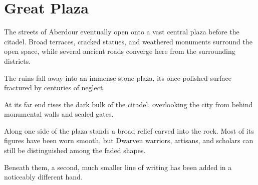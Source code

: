 \section*{ Great Plaza}
{\entryfont The streets of Aberdour eventually open onto a vast central plaza before the citadel. Broad terraces, cracked statues, and weathered monuments surround the open space, while several ancient roads converge here from the surrounding districts.}
\begin{DndReadAloud}
	The ruins fall away into an immense stone plaza, its once-polished surface fractured by centuries of neglect.

	At its far end rises the dark bulk of the citadel, overlooking the city from behind monumental walls and sealed gates.

	Along one side of the plaza stands a broad relief carved into the rock. Most of its figures have been worn smooth, but Dwarven warriors, artisans, and scholars can still be distinguished among the faded shapes.

	Beneath them, a second, much smaller line of writing has been added in a noticeably different hand.
\end{DndReadAloud}
